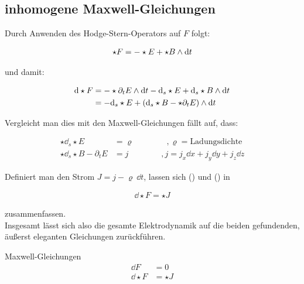 \subsection{inhomogene Maxwell-Gleichungen}
Durch Anwenden des Hodge-Stern-Operators auf $F$ folgt:

\begin{align}
\star F = - \star E + \star B \wedge \dd t 
\end{align}

und damit:

\begin{align}
\dd \star F &= - \star \partial_t E  \wedge \dd t - \dd_s \star E + \dd_s \star B \wedge \dd t \notag \\
				&= - \dd_s \star E + (\dd_s \star B - \star \partial_t E) \wedge \dd t 
\end{align}

Vergleicht man dies mit den Maxwell-Gleichungen fällt auf, dass:

\begin{align}
\star \dd_s \star E &= \varrho \qquad\qquad,\varrho=\text{Ladungsdichte} \\
\star \dd_s\star B - \partial_t E &= j \qquad\qquad ,j=j_x \dd x + j_y \dd y + j_z \dd z
\end{align}

Definiert man den Strom $J=j - \varrho \  \dd t$, lassen sich () und () in 

\begin{align}
\dd \star F = \star J
\end{align}

zusammenfassen. \\

Insgesamt lässt sich also die gesamte Elektrodynamik auf die beiden gefundenden, äußerst eleganten Gleichungen zurückführen.

\begin{mybox}{Maxwell-Gleichungen}
\begin{align*}
\dd F &= 0 \\
\dd \star F &= \star J
\end{align*}
\end{mybox}
